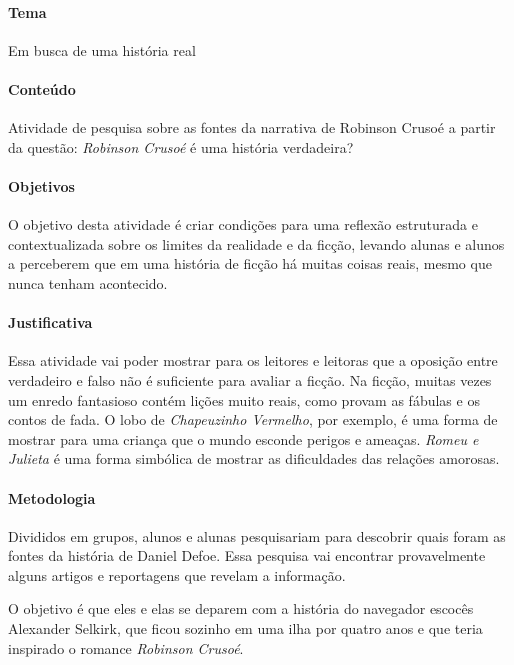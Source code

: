 \documentclass[12pt]{extarticle}
\begin{document}
\paragraph{Tema} Em busca de uma história real


\paragraph{Conteúdo} Atividade de pesquisa sobre as fontes da narrativa de Robinson Crusoé a partir da questão: \emph{Robinson Crusoé} é uma história verdadeira?

\paragraph{Objetivos}
O objetivo desta atividade é criar condições para uma reflexão
estruturada e contextualizada sobre os limites da realidade e da ficção,
levando alunas e alunos a perceberem que em uma história de ficção há
muitas coisas reais, mesmo que nunca tenham acontecido.

\paragraph{Justificativa}
Essa atividade vai poder mostrar para os leitores e leitoras que a
oposição entre verdadeiro e falso não é suficiente para avaliar a
ficção. Na ficção, muitas vezes um enredo fantasioso contém lições muito
reais, como provam as fábulas e os contos de fada. O lobo de
\emph{Chapeuzinho Vermelho}, por exemplo, é uma forma de mostrar para uma criança que
o mundo esconde perigos e ameaças. \emph{Romeu e Julieta} é uma forma
simbólica de mostrar as dificuldades das relações amorosas.

\paragraph{Metodologia}
Divididos em grupos, alunos e alunas pesquisariam para descobrir quais
foram as fontes da história de Daniel Defoe. Essa pesquisa vai encontrar provavelmente alguns artigos e reportagens
que revelam a informação.

O objetivo é que eles e elas se deparem com a história do navegador
escocês Alexander Selkirk, que ficou sozinho em uma ilha por quatro anos
e que teria inspirado o romance \emph{Robinson Crusoé}.

\end{document}
